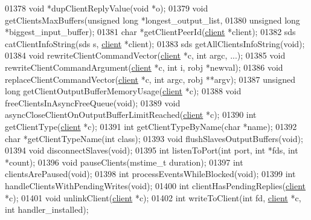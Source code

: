 \begin{DoxyCode}
{{{{{{{01378 \textcolor{keywordtype}{void} *dupClientReplyValue(\textcolor{keywordtype}{void} *o);
01379 \textcolor{keywordtype}{void} getClientsMaxBuffers(\textcolor{keywordtype}{unsigned} \textcolor{keywordtype}{long} *longest\_output\_list,
01380                           \textcolor{keywordtype}{unsigned} \textcolor{keywordtype}{long} *biggest\_input\_buffer);
01381 \textcolor{keywordtype}{char} *getClientPeerId(\hyperlink{structclient}{client} *client);
01382 sds catClientInfoString(sds s, \hyperlink{structclient}{client} *client);
01383 sds getAllClientsInfoString(\textcolor{keywordtype}{void});
01384 \textcolor{keywordtype}{void} rewriteClientCommandVector(\hyperlink{structclient}{client} *c, \textcolor{keywordtype}{int} argc, ...);
01385 \textcolor{keywordtype}{void} rewriteClientCommandArgument(\hyperlink{structclient}{client} *c, \textcolor{keywordtype}{int} i, robj *newval);
01386 \textcolor{keywordtype}{void} replaceClientCommandVector(\hyperlink{structclient}{client} *c, \textcolor{keywordtype}{int} argc, robj **argv);
01387 \textcolor{keywordtype}{unsigned} \textcolor{keywordtype}{long} getClientOutputBufferMemoryUsage(\hyperlink{structclient}{client} *c);
01388 \textcolor{keywordtype}{void} freeClientsInAsyncFreeQueue(\textcolor{keywordtype}{void});
01389 \textcolor{keywordtype}{void} asyncCloseClientOnOutputBufferLimitReached(\hyperlink{structclient}{client} *c);
01390 \textcolor{keywordtype}{int} getClientType(\hyperlink{structclient}{client} *c);
01391 \textcolor{keywordtype}{int} getClientTypeByName(\textcolor{keywordtype}{char} *name);
01392 \textcolor{keywordtype}{char} *getClientTypeName(\textcolor{keywordtype}{int} \textcolor{keyword}{class});
01393 \textcolor{keywordtype}{void} flushSlavesOutputBuffers(\textcolor{keywordtype}{void});
01394 \textcolor{keywordtype}{void} disconnectSlaves(\textcolor{keywordtype}{void});
01395 \textcolor{keywordtype}{int} listenToPort(\textcolor{keywordtype}{int} port, \textcolor{keywordtype}{int} *fds, \textcolor{keywordtype}{int} *count);
01396 \textcolor{keywordtype}{void} pauseClients(mstime\_t duration);
01397 \textcolor{keywordtype}{int} clientsArePaused(\textcolor{keywordtype}{void});
01398 \textcolor{keywordtype}{int} processEventsWhileBlocked(\textcolor{keywordtype}{void});
01399 \textcolor{keywordtype}{int} handleClientsWithPendingWrites(\textcolor{keywordtype}{void});
01400 \textcolor{keywordtype}{int} clientHasPendingReplies(\hyperlink{structclient}{client} *c);
01401 \textcolor{keywordtype}{void} unlinkClient(\hyperlink{structclient}{client} *c);
01402 \textcolor{keywordtype}{int} writeToClient(\textcolor{keywordtype}{int} fd, \hyperlink{structclient}{client} *c, \textcolor{keywordtype}{int} handler\_installed);
}}}}}}}
\end{DoxyCode}
